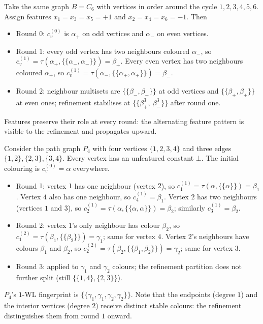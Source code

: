 \begin{example}\label{ex:wl-feat}
Take the same graph $B = C_6$ with vertices in order around the cycle
$1, 2, 3, 4, 5, 6$. Assign features $x_1 = x_3 = x_5 = +1$ and
$x_2 = x_4 = x_6 = -1$. Then
\begin{itemize}
\item Round $0$: $c_v^{(0)}$ is $\alpha_+$ on odd vertices and
$\alpha_-$ on even vertices.
\item Round $1$: every odd vertex has two neighbours coloured
$\alpha_-$, so $c_v^{(1)} = \tau(\alpha_+, \{\!\{\alpha_-,
\alpha_-\}\!\}) = \beta_+$. Every even vertex has two neighbours
coloured $\alpha_+$, so $c_v^{(1)} = \tau(\alpha_-, \{\!\{\alpha_+,
\alpha_+\}\!\}) = \beta_-$.
\item Round $2$: neighbour multisets are $\{\!\{\beta_-,
\beta_-\}\!\}$ at odd vertices and $\{\!\{\beta_+, \beta_+\}\!\}$ at
even ones; refinement stabilises at $\{\!\{\beta_+^3,\ \beta_-^3\}\!\}$
after round one.
\end{itemize}
Features preserve their role at every round: the alternating feature
pattern is visible to the refinement and propagates upward.
\end{example}

\begin{example}\label{ex:wl-tree}
Consider the path graph $P_4$ with four vertices $\{1, 2, 3, 4\}$
and three edges $\{1, 2\}, \{2, 3\}, \{3, 4\}$. Every vertex has an
unfeatured constant $\bot$. The initial colouring is $c_v^{(0)} =
\alpha$ everywhere.
\begin{itemize}
\item Round $1$: vertex $1$ has one neighbour (vertex $2$), so
$c_1^{(1)} = \tau(\alpha, \{\!\{\alpha\}\!\}) = \beta_1$. Vertex $4$
also has one neighbour, so $c_4^{(1)} = \beta_1$. Vertex $2$ has two
neighbours (vertices $1$ and $3$), so $c_2^{(1)} = \tau(\alpha,
\{\!\{\alpha, \alpha\}\!\}) = \beta_2$; similarly $c_3^{(1)} =
\beta_2$.
\item Round $2$: vertex $1$'s only neighbour has colour $\beta_2$,
so $c_1^{(2)} = \tau(\beta_1, \{\!\{\beta_2\}\!\}) = \gamma_1$; same
for vertex $4$. Vertex $2$'s neighbours have colours $\beta_1$ and
$\beta_2$, so $c_2^{(2)} = \tau(\beta_2, \{\!\{\beta_1, \beta_2\}\!\})
= \gamma_2$; same for vertex $3$.
\item Round $3$: applied to $\gamma_1$ and $\gamma_2$ colours; the
refinement partition does not further split (still $\{\{1, 4\},
\{2, 3\}\}$).
\end{itemize}
$P_4$'s $1$-WL fingerprint is $\{\!\{\gamma_1, \gamma_1, \gamma_2,
\gamma_2\}\!\}$. Note that the endpoints (degree $1$) and the
interior vertices (degree $2$) receive distinct stable colours: the
refinement distinguishes them from round $1$ onward.
\end{example}

